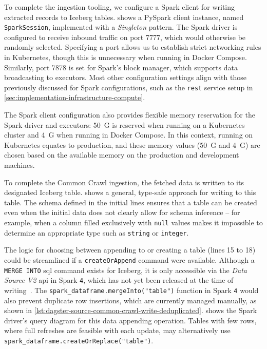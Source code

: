 To complete the ingestion tooling, we configure a Spark client for writing extracted records to Iceberg tables.
 shows a PySpark client instance, named \texttt{SparkSession}, implemented with a \textit{Singleton} pattern.
The Spark driver is configured to receive inbound traffic on port 7777, which would otherwise be randomly selected.
Specifying a port allows us to establish strict networking rules in Kubernetes, though this is unnecessary when running in Docker Compose.
Similarly, port 7878 is set for Spark's block manager, which supports data broadcasting to executors.
Most other configuration settings align with those previously discussed for Spark configurations, such as the \texttt{rest} service setup in \cref{sec:implementation-infrastructure-compute}.

The Spark client configuration also provides flexible memory reservation for the Spark driver and executors: 50~G is reserved when running on a Kubernetes cluster and 4~G when running in Docker Compose.
In this context, running on Kubernetes equates to production, and these memory values (50~G and 4~G) are chosen based on the available memory on the production and development machines.

To complete the Common Crawl ingestion, the fetched data is written to its designated Iceberg table.
 shows a general, type-safe approach for writing to this table.
The schema defined in the initial lines ensures that a table can be created even when the initial data does not clearly allow for schema inference -- for example, when a column filled exclusively with \texttt{null} values makes it impossible to determine an appropriate type such as \texttt{string} or \texttt{integer}.

The logic for choosing between appending to or creating a table (lines 15 to 18) could be streamlined if a \texttt{createOrAppend} command were available.
Although a \texttt{MERGE INTO} \ac{sql} command exists for Iceberg, it is only accessible via the \textit{Data Source V2} \ac{api} in Spark \texttt{4}, which has not yet been released at the time of writing~\cite{Gao2023}.
The \texttt{spark\_dataframe.mergeInto("table")} function in Spark \texttt{4} would also prevent duplicate row insertions, which are currently managed manually, as shown in \cref{lst:dagster-source-common-crawl-write-deduplicated}.
 shows the Spark driver's query diagram for this data appending operation.
Tables with few rows, where full refreshes are feasible with each update, may alternatively use \texttt{spark\_dataframe.createOrReplace("table")}.

